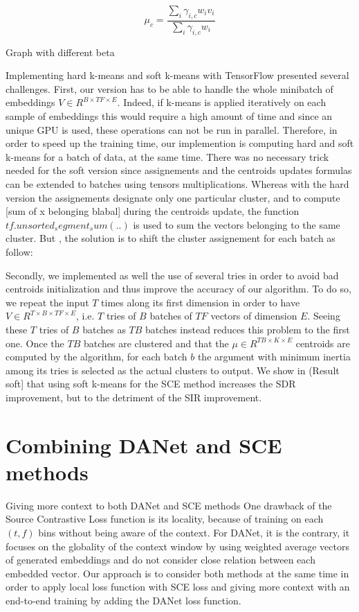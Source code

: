 \documentclass[master,final,11pt]{iscs-thesis}
\begin{document}
\[ \mu_c = \frac{\sum_i \gamma_{i,c}w_iv_i}{\sum_i \gamma_{i,c}w_i}  \]

Graph with different beta

Implementing hard k-means and soft k-means with TensorFlow presented several challenges. First, our version has to be able to handle the whole minibatch of embeddings $V\in R^{B\times TF \times E}$. Indeed, if k-means is applied iteratively on each sample of embeddings this would require a high amount of time and since an unique GPU is used, these operations can not be run in parallel. Therefore, in order to speed up the training time, our implemention is computing hard and soft k-means for a batch of data, at the same time. There was no necessary trick needed for the soft version since assignements and the centroids updates formulas can be extended to batches using tensors multiplications. Whereas with the hard version the assignements designate only one particular cluster, and to compute [sum of x belonging blabal] during the centroids update, the function $tf.unsorted_segment_sum(..)$ is used to sum the vectors belonging to the same cluster. But , the solution is to shift the cluster assignement for each batch as follow:


Secondly, we implemented as well the use of several tries in order to avoid bad centroids initialization and thus improve the accuracy of our algorithm. To do so, we repeat the input $T$ times along its first dimension in order to have $V\in R^{T \times B\times TF \times E}$, i.e. $T$ tries of $B$ batches of $TF$ vectors of dimension $E$. Seeing these $T$ tries of $B$ batches as $TB$ batches instead reduces this problem to the first one. Once the $TB$ batches are clustered and that the $\mu \in R^{TB\times K \times E}$ centroids are computed by the algorithm, for each batch $b$ the argument with minimum inertia among its tries is selected as the actual clusters to output.
We show in (Result soft] that using soft k-means for the SCE method increases the SDR improvement, but to the detriment of the SIR improvement.



\section{Combining DANet and SCE methods}

Giving more context to both DANet and SCE methods
One drawback of the Source Contrastive Loss function is its locality, because of training on each $(t,f)$ bins without being aware of the context. For DANet, it is the contrary, it focuses on the globality of the context window by using weighted average vectors of generated embeddings and do not consider close relation between each embedded vector.
Our approach is to consider both methods at the same time in order to apply local loss function with SCE loss and giving more context with an end-to-end training by adding the DANet loss function.
\end{document}

